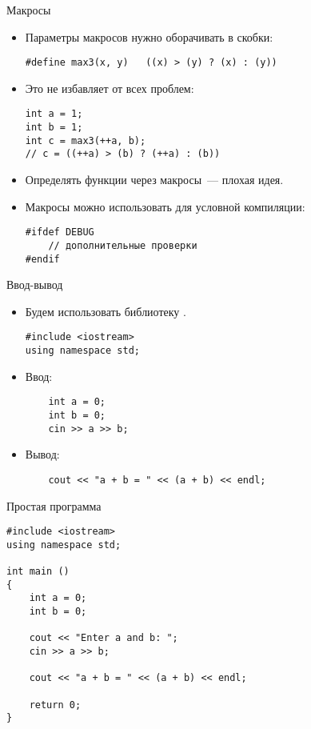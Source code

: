 \documentclass{beamer}
\begin{document}
\begin{frame}[fragile]{Макросы}
\begin{itemize}
    \item Параметры макросов нужно оборачивать в скобки:
    \begin{lstlisting}
#define max3(x, y)   ((x) > (y) ? (x) : (y))
    \end{lstlisting}

    \item Это не избавляет от всех проблем:
    \begin{lstlisting}
int a = 1;
int b = 1;
int c = max3(++a, b); 
// c = ((++a) > (b) ? (++a) : (b))
    \end{lstlisting}

    \item Определять функции через макросы~--- плохая идея.

    \item Макросы можно использовать для условной компиляции:
        \begin{lstlisting}
#ifdef DEBUG
    // дополнительные проверки
#endif
        \end{lstlisting}

\end{itemize}
\end{frame}

\begin{frame}[fragile]{Ввод-вывод}
\begin{itemize}    
    \item Будем использовать библиотеку .
    \begin{lstlisting}
#include <iostream>
using namespace std;
    \end{lstlisting}

    \item Ввод:
    \begin{lstlisting}
    int a = 0;
    int b = 0;
    cin >> a >> b;
    \end{lstlisting}

    \item Вывод:
    \begin{lstlisting}
    cout << "a + b = " << (a + b) << endl;
    \end{lstlisting}
\end{itemize}
\end{frame}

\begin{frame}[fragile]{Простая программа}
    \begin{lstlisting}
#include <iostream>
using namespace std;

int main () 
{
    int a = 0;
    int b = 0;

    cout << "Enter a and b: ";
    cin >> a >> b;

    cout << "a + b = " << (a + b) << endl;

    return 0;
}
    \end{lstlisting}
\end{frame}
\end{document}
